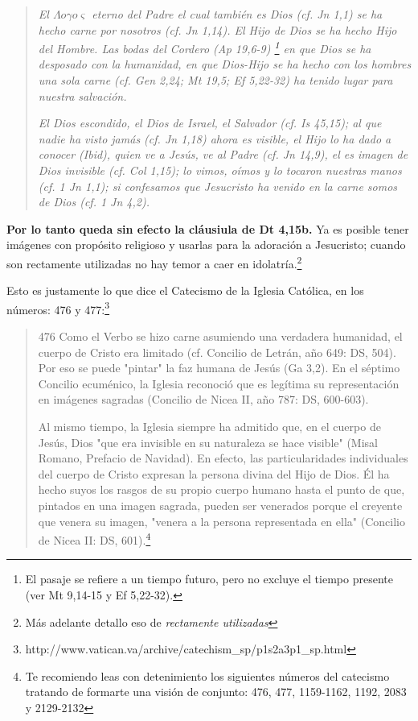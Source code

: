 \documentclass{article}
\begin{document}
\begin{quote}
\emph{El $\Lambda o \gamma o \varsigma$ eterno del Padre el cual tambi\'en es Dios (\emph{cf}. Jn 1,1) se ha hecho \emph{carne} por nosotros (\emph{cf}. Jn 1,14). El Hijo de Dios se ha hecho Hijo del Hombre. Las bodas del Cordero (Ap 19,6-9)%
    \footnote{El pasaje se refiere a un tiempo futuro, pero no excluye el tiempo presente (ver Mt 9,14-15 y Ef 5,22-32).}
en que Dios se ha desposado con la humanidad, en que Dios-Hijo se ha hecho con los hombres una sola carne (\emph{cf}. Gen 2,24; Mt 19,5; Ef 5,22-32) ha tenido lugar para nuestra salvaci\'on.}

\emph{El Dios escondido, el Dios de Israel, el Salvador (\emph{cf}. Is 45,15); al que nadie ha visto jam\'as (\emph{cf}. Jn 1,18) ahora es visible, el Hijo lo ha dado a conocer (\emph{Ibid}), quien ve a Jes\'us, ve al Padre (\emph{cf}. Jn 14,9), el es imagen de Dios invisible (\emph{cf}. Col 1,15); lo vimos, o\'{i}mos y lo tocaron nuestras manos (\emph{cf}. 1 Jn 1,1); si confesamos que Jesucristo ha venido en la carne somos de Dios (\emph{cf}. 1 Jn 4,2).}
\end{quote}

\noindent
\textbf{Por lo tanto queda sin efecto la cl\'ausiula de Dt 4,15b.} Ya es posible tener im\'agenes con prop\'osito religioso y usarlas para la adoraci\'on a Jesucristo; cuando son rectamente utilizadas no hay temor a caer en idolatr\'{i}a.\footnote{M\'as adelante detallo eso de \emph{rectamente utilizadas}}

Esto es justamente lo que dice el Catecismo de la Iglesia Católica, en los números: 476 y 477:\footnote{http://www.vatican.va/archive/catechism\_sp/p1s2a3p1\_sp.html}

\begin{quote}
476 Como el Verbo se hizo carne asumiendo una verdadera humanidad, el cuerpo de Cristo era limitado (cf. Concilio de Letrán, año 649: DS, 504). Por eso se puede "pintar" la faz humana de Jesús (Ga 3,2). En el séptimo Concilio ecuménico, la Iglesia reconoció que es legítima su representación en imágenes sagradas (Concilio de Nicea II, año 787: DS, 600-603).

 Al mismo tiempo, la Iglesia siempre ha admitido que, en el cuerpo de Jesús, Dios "que era invisible en su naturaleza se hace visible" (Misal Romano, Prefacio de Navidad). En efecto, las particularidades individuales del cuerpo de Cristo expresan la persona divina del Hijo de Dios. Él ha hecho suyos los rasgos de su propio cuerpo humano hasta el punto de que, pintados en una imagen sagrada, pueden ser venerados porque el creyente que venera su imagen, "venera a la persona representada en ella" (Concilio de Nicea II: DS, 601).\footnote{Te recomiendo leas con detenimiento los siguientes números del catecismo tratando de formarte una visión de conjunto: 476, 477, 1159-1162, 1192, 2083 y 2129-2132}
\end{quote}
\end{document}
